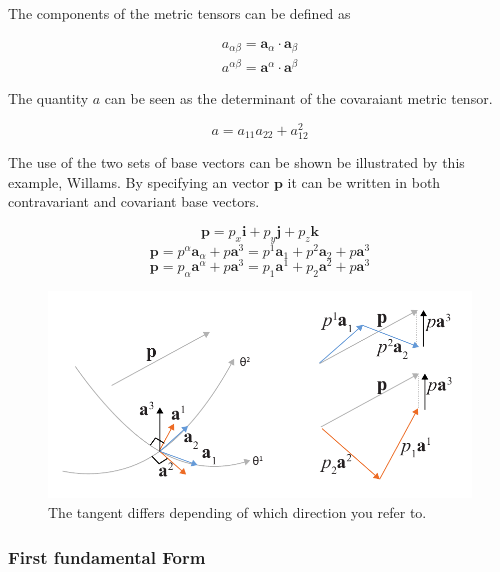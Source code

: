 The components of the metric tensors can be defined as

\begin{align} \label{metricComp}
a_{\alpha \beta} = \textbf{a}_\alpha \cdot \textbf{a}_\beta \\
a^{\alpha \beta} = \textbf{a}^\alpha \cdot \textbf{a}^\beta 
\end{align}

The quantity $a$ can be seen as the determinant of the covaraiant metric tensor.

\begin{equation}
a = a_{11} a_{22} + a_{12}^2
\end{equation}



The use of the two sets of base vectors can be shown be illustrated by this example, Willams. By specifying an vector $\textbf{p}$ it can be written in both contravariant and covariant base vectors.

\begin{equation}
    \textbf{p} = p_x \textbf{i} +p_y \textbf{j} +p_z \textbf{k}  
\end{equation}
\begin{equation}
    \textbf{p} = p^\alpha \textbf{a}_\alpha + p \textbf{a}^3 =   p^1 \textbf{a}_1 +  p^2 \textbf{a}_2 + p \textbf{a}^3 
\end{equation}
\begin{equation}
    \textbf{p} = p_\alpha \textbf{a}^\alpha + p \textbf{a}^3=  p_1 \textbf{a}^1 +  p_2 \textbf{a}^2 + p \textbf{a}^3   
\end{equation}


\begin{figure}[H]
\centering
\includegraphics[width=0.8\linewidth ]{figure/Theory/Covariant.pdf}
\caption{The tangent differs depending of which direction you refer to. }
\end{figure}




\subsubsection{First fundamental Form}

